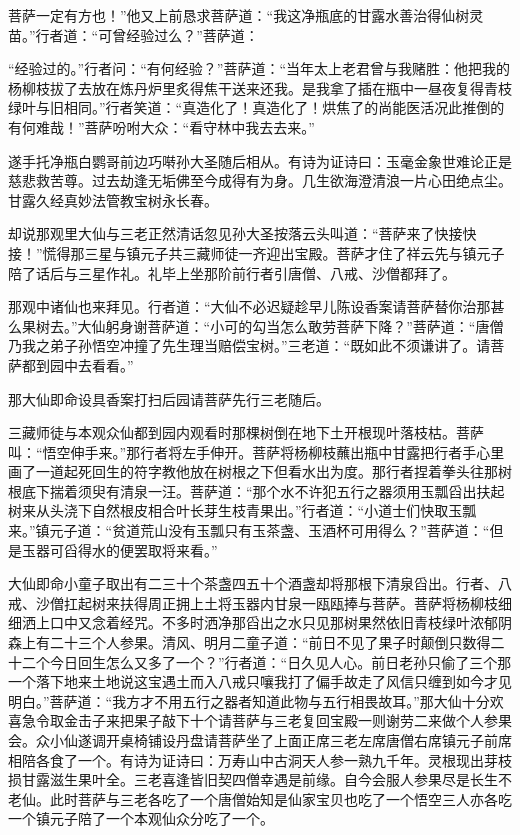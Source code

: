 \documentclass[12pt,UTF8]{ctexbook}
\begin{document}
菩萨一定有方也！”他又上前恳求菩萨道：“我这净瓶底的甘露水善治得仙树灵苗。”行者道：“可曾经验过么？”菩萨道：

“经验过的。”行者问：“有何经验？”菩萨道：“当年太上老君曾与我赌胜：他把我的杨柳枝拔了去放在炼丹炉里炙得焦干送来还我。是我拿了插在瓶中一昼夜复得青枝绿叶与旧相同。”行者笑道：“真造化了！真造化了！烘焦了的尚能医活况此推倒的有何难哉！”菩萨吩咐大众：“看守林中我去去来。”

遂手托净瓶白鹦哥前边巧啭孙大圣随后相从。有诗为证诗曰：玉毫金象世难论正是慈悲救苦尊。过去劫逢无垢佛至今成得有为身。几生欲海澄清浪一片心田绝点尘。甘露久经真妙法管教宝树永长春。

却说那观里大仙与三老正然清话忽见孙大圣按落云头叫道：“菩萨来了快接快接！”慌得那三星与镇元子共三藏师徒一齐迎出宝殿。菩萨才住了祥云先与镇元子陪了话后与三星作礼。礼毕上坐那阶前行者引唐僧、八戒、沙僧都拜了。

那观中诸仙也来拜见。行者道：“大仙不必迟疑趁早儿陈设香案请菩萨替你治那甚么果树去。”大仙躬身谢菩萨道：“小可的勾当怎么敢劳菩萨下降？”菩萨道：“唐僧乃我之弟子孙悟空冲撞了先生理当赔偿宝树。”三老道：“既如此不须谦讲了。请菩萨都到园中去看看。”

那大仙即命设具香案打扫后园请菩萨先行三老随后。

三藏师徒与本观众仙都到园内观看时那棵树倒在地下土开根现叶落枝枯。菩萨叫：“悟空伸手来。”那行者将左手伸开。菩萨将杨柳枝蘸出瓶中甘露把行者手心里画了一道起死回生的符字教他放在树根之下但看水出为度。那行者捏着拳头往那树根底下揣着须臾有清泉一汪。菩萨道：“那个水不许犯五行之器须用玉瓢舀出扶起树来从头浇下自然根皮相合叶长芽生枝青果出。”行者道：“小道士们快取玉瓢来。”镇元子道：“贫道荒山没有玉瓢只有玉茶盏、玉酒杯可用得么？”菩萨道：“但是玉器可舀得水的便罢取将来看。”

大仙即命小童子取出有二三十个茶盏四五十个酒盏却将那根下清泉舀出。行者、八戒、沙僧扛起树来扶得周正拥上土将玉器内甘泉一瓯瓯捧与菩萨。菩萨将杨柳枝细细洒上口中又念着经咒。不多时洒净那舀出之水只见那树果然依旧青枝绿叶浓郁阴森上有二十三个人参果。清风、明月二童子道：“前日不见了果子时颠倒只数得二十二个今日回生怎么又多了一个？”行者道：“日久见人心。前日老孙只偷了三个那一个落下地来土地说这宝遇土而入八戒只嚷我打了偏手故走了风信只缠到如今才见明白。”菩萨道：“我方才不用五行之器者知道此物与五行相畏故耳。”那大仙十分欢喜急令取金击子来把果子敲下十个请菩萨与三老复回宝殿一则谢劳二来做个人参果会。众小仙遂调开桌椅铺设丹盘请菩萨坐了上面正席三老左席唐僧右席镇元子前席相陪各食了一个。有诗为证诗曰：万寿山中古洞天人参一熟九千年。灵根现出芽枝损甘露滋生果叶全。三老喜逢皆旧契四僧幸遇是前缘。自今会服人参果尽是长生不老仙。此时菩萨与三老各吃了一个唐僧始知是仙家宝贝也吃了一个悟空三人亦各吃一个镇元子陪了一个本观仙众分吃了一个。
\end{document}
